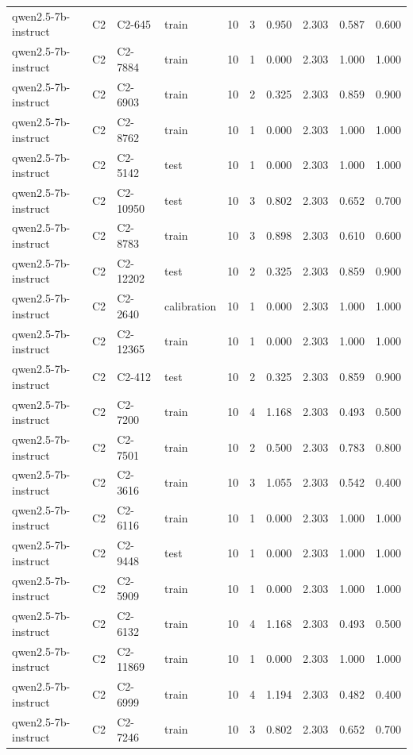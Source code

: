 \begin{table}
\begin{tabular}{llllrrrrrr}
qwen2.5-7b-instruct & C2 & C2-645 & train & 10 & 3 & 0.950 & 2.303 & 0.587 & 0.600 \\
qwen2.5-7b-instruct & C2 & C2-7884 & train & 10 & 1 & 0.000 & 2.303 & 1.000 & 1.000 \\
qwen2.5-7b-instruct & C2 & C2-6903 & train & 10 & 2 & 0.325 & 2.303 & 0.859 & 0.900 \\
qwen2.5-7b-instruct & C2 & C2-8762 & train & 10 & 1 & 0.000 & 2.303 & 1.000 & 1.000 \\
qwen2.5-7b-instruct & C2 & C2-5142 & test & 10 & 1 & 0.000 & 2.303 & 1.000 & 1.000 \\
qwen2.5-7b-instruct & C2 & C2-10950 & test & 10 & 3 & 0.802 & 2.303 & 0.652 & 0.700 \\
qwen2.5-7b-instruct & C2 & C2-8783 & train & 10 & 3 & 0.898 & 2.303 & 0.610 & 0.600 \\
qwen2.5-7b-instruct & C2 & C2-12202 & test & 10 & 2 & 0.325 & 2.303 & 0.859 & 0.900 \\
qwen2.5-7b-instruct & C2 & C2-2640 & calibration & 10 & 1 & 0.000 & 2.303 & 1.000 & 1.000 \\
qwen2.5-7b-instruct & C2 & C2-12365 & train & 10 & 1 & 0.000 & 2.303 & 1.000 & 1.000 \\
qwen2.5-7b-instruct & C2 & C2-412 & test & 10 & 2 & 0.325 & 2.303 & 0.859 & 0.900 \\
qwen2.5-7b-instruct & C2 & C2-7200 & train & 10 & 4 & 1.168 & 2.303 & 0.493 & 0.500 \\
qwen2.5-7b-instruct & C2 & C2-7501 & train & 10 & 2 & 0.500 & 2.303 & 0.783 & 0.800 \\
qwen2.5-7b-instruct & C2 & C2-3616 & train & 10 & 3 & 1.055 & 2.303 & 0.542 & 0.400 \\
qwen2.5-7b-instruct & C2 & C2-6116 & train & 10 & 1 & 0.000 & 2.303 & 1.000 & 1.000 \\
qwen2.5-7b-instruct & C2 & C2-9448 & test & 10 & 1 & 0.000 & 2.303 & 1.000 & 1.000 \\
qwen2.5-7b-instruct & C2 & C2-5909 & train & 10 & 1 & 0.000 & 2.303 & 1.000 & 1.000 \\
qwen2.5-7b-instruct & C2 & C2-6132 & train & 10 & 4 & 1.168 & 2.303 & 0.493 & 0.500 \\
qwen2.5-7b-instruct & C2 & C2-11869 & train & 10 & 1 & 0.000 & 2.303 & 1.000 & 1.000 \\
qwen2.5-7b-instruct & C2 & C2-6999 & train & 10 & 4 & 1.194 & 2.303 & 0.482 & 0.400 \\
qwen2.5-7b-instruct & C2 & C2-7246 & train & 10 & 3 & 0.802 & 2.303 & 0.652 & 0.700 \\

\end{tabular}
\end{table}
